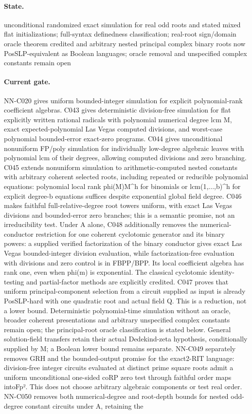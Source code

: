 \paragraph{State.} unconditional randomized exact simulation for real odd roots and stated mixed flat initializations; full-syntax definedness classification; real-root sign/domain oracle theorem credited and arbitrary nested principal complex binary roots now PosSLP-equivalent as Boolean languages; oracle removal and unspecified complex constants remain open
\paragraph{Current gate.} NN-C020 gives uniform bounded-integer simulation for explicit polynomial-rank coefficient algebras. C043 gives deterministic division-free simulation for flat explicitly written rational radicals with polynomial numerical degree lcm M, exact expected-polynomial Las Vegas computed divisions, and worst-case polynomial bounded-error exact-zero programs. C044 gives unconditional nonuniform FP/poly simulation for individually low-degree algebraic leaves with polynomial lcm of their degrees, allowing computed divisions and zero branching. C045 extends nonuniform simulation to arithmetic-computed nested constants with arbitrary coherent selected roots, including repeated or reducible polynomial equations: polynomial local rank phi(M)M\textasciicircum{}h for binomials or lcm(1,...,b)\textasciicircum{}h for explicit degree-b equations suffices despite exponential global field degree. C046 makes faithful full-relative-degree root towers uniform, with exact Las Vegas divisions and bounded-error zero branches; this is a semantic promise, not an irreducibility test. Under A alone, C048 additionally removes the numerical-conductor restriction for one coherent cyclotomic generator and its binary powers: a supplied verified factorization of the binary conductor gives exact Las Vegas bounded-integer division evaluation, while factorization-free evaluation with divisions and zero control is in FBPP/BPP. Its local coefficient algebra has rank one, even when phi(m) is exponential. The classical cyclotomic identity-testing and partial-factor methods are explicitly credited. C047 proves that uniform principal-component selection from a circuit supplied as input is already PosSLP-hard with one quadratic root and actual field Q. This is a reduction, not a lower bound. Deterministic polynomial-time simulation without an oracle, broader coherent presentations and arbitrary unspecified complex constants remain open; the principal-root oracle classification is stated below. General solution-field transfers retain their actual Dedekind-zeta hypothesis, conditionally supplied by M; a Boolean lower bound remains separate. NN-C049 separately removes GRH and the bounded-output promise for the exact2-RIT language: division-free integer circuits evaluated at distinct prime square roots admit a uniform unconditional one-sided coRP zero test through faithful order maps intoFp². This does not choose arbitrary algebraic components or test real order. NN-C050 removes both numerical-degree and root-depth bounds for nested odd-degree constant circuits under A, retaining the 